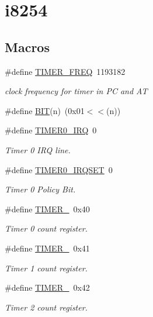 \hypertarget{group__i8254}{}\section{i8254}
\label{group__i8254}
\subsection*{Macros}
\begin{DoxyCompactItemize}
\item 
\#define \hyperlink{group__i8254_gacf926951944b6cf370b7229ebd50dd8b}{T\+I\+M\+E\+R\+\_\+\+F\+R\+EQ}~1193182
\begin{DoxyCompactList}\small\item\em clock frequency for timer in PC and AT \end{DoxyCompactList}\item 
\#define \hyperlink{group__i8254_ga3a8ea58898cb58fc96013383d39f482c}{B\+IT}(n)~(0x01$<$$<$(n))
\item 
\#define \hyperlink{group__i8254_ga30bf84c312af248cb81bb224e09f9ba8}{T\+I\+M\+E\+R0\+\_\+\+I\+RQ}~0
\begin{DoxyCompactList}\small\item\em Timer 0 I\+RQ line. \end{DoxyCompactList}\item 
\#define \hyperlink{group__i8254_ga5a49703fe985c8df41c3be0ed091ac45}{T\+I\+M\+E\+R0\+\_\+\+I\+R\+Q\+S\+ET}~0
\begin{DoxyCompactList}\small\item\em Timer 0 Policy Bit. \end{DoxyCompactList}\item 
\#define \hyperlink{group__i8254_gacc9ff9df4a9674a1ce9ba08fc4a4679e}{T\+I\+M\+E\+R\+\_}~0x40
\begin{DoxyCompactList}\small\item\em Timer 0 count register. \end{DoxyCompactList}\item 
\#define \hyperlink{group__i8254_gac62c99c2a9289891c1b83052242cca49}{T\+I\+M\+E\+R\+\_}~0x41
\begin{DoxyCompactList}\small\item\em Timer 1 count register. \end{DoxyCompactList}\item 
\#define \hyperlink{group__i8254_ga1f34f18ad0ab8cace46b615773b48735}{T\+I\+M\+E\+R\+\_}~0x42
\begin{DoxyCompactList}\small\item\em Timer 2 count register. \end{DoxyCompactList}\item 
$$
\end{DoxyCompactItemize}
